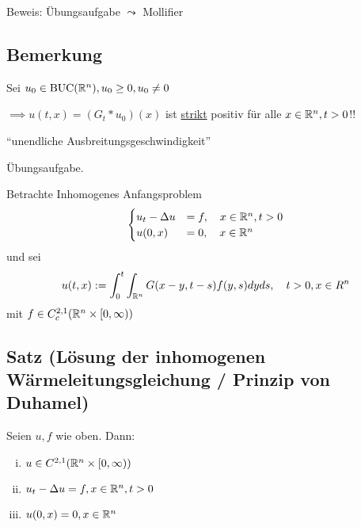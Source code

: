 Beweis: Übungsaufgabe $\leadsto$ Mollifier

\subsection{Bemerkung}

Sei $u_0 \in \operatorname{BUC}(\mathbb{R}^n), u_0 \geq 0, u_0 \neq 0$

$\implies u(t,x) = (G_t \ast u_0)(x)$ ist \underline{strikt} positiv für alle $x \in \mathbb{R}^n, t > 0$!!

``unendliche Ausbreitungsgeschwindigkeit''

Übungsaufgabe.

Betrachte Inhomogenes Anfangsproblem
$$
\begin{cases}
  u_t - \Delta u &= f, \quad x \in \mathbb{R}^n, t > 0 \\
  u(0,x) &= 0, \quad x \in \mathbb{R}^n
\end{cases}
$$
und sei
$$
u(t,x) := \int_0^t \int_{\mathbb{R}^n} G(x - y, t - s)f(y,s) dy ds, \quad t> 0, x \in R^n
$$
mit $f \in C_c^{2,1}(\mathbb{R}^n \times[0,\infty))$

\subsection{Satz (Lösung der inhomogenen Wärmeleitungsgleichung / Prinzip von Duhamel)}

Seien $u, f$ wie oben. Dann:
\begin{enumerate}[(i)]
  \item $u \in C^{2,1}(\mathbb{R}^n \times [0, \infty))$
  \item $u_t - \Delta u = f, x \in \mathbb{R}^n, t> 0$
  \item $u(0,x) = 0, x \in \mathbb{R}^n$
\end{enumerate}

